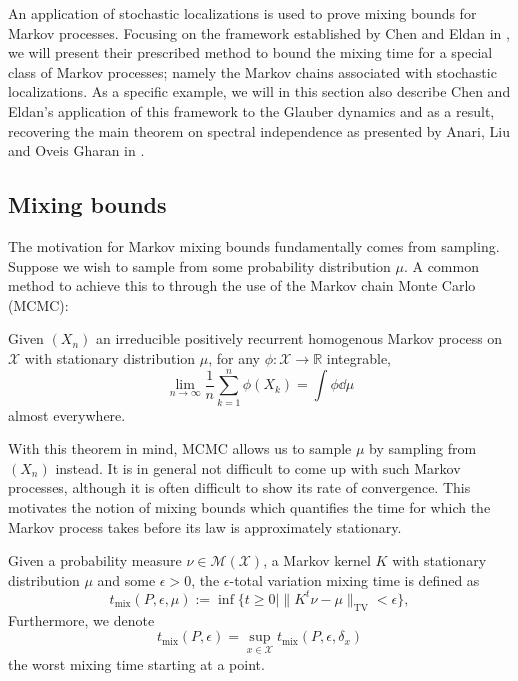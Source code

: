 An application of stochastic localizations is used to prove mixing bounds for Markov processes. 
Focusing on the framework established by Chen and Eldan in \cite{Chen_2022}, we will present their prescribed 
method to bound the mixing time for a special class of Markov processes; namely the Markov chains 
associated with stochastic localizations. 
As a specific example, we will in this section also describe Chen and Eldan's \cite{Chen_2022} application 
of this framework to the Glauber dynamics and as a result, recovering the main theorem on spectral independence as 
presented by Anari, Liu and Oveis Gharan in \cite{Anari_2020}.

\subsection{Mixing bounds}

The motivation for Markov mixing bounds fundamentally comes from sampling. Suppose we wish to sample 
from some probability distribution $\mu$. A common method to achieve this to through the use of the 
Markov chain Monte Carlo (MCMC):
\begin{theorem}\label{thm:markov_conv}
  Given \((X_n)\) an irreducible positively recurrent homogenous Markov process on \(\mathcal{X}\) with
  stationary distribution \(\mu\), for any \(\phi : \mathcal{X} \to \mathbb{R}\) integrable, 
  \[\lim_{n \to \infty} \frac{1}{n} \sum_{k = 1}^n \phi(X_k) = \int \phi \dd \mu\]
  almost everywhere.  
\end{theorem}
With this theorem in mind, MCMC allows us to sample \(\mu\) by sampling from \((X_n)\) instead. It is in general 
not difficult to come up with such Markov processes, although it is often difficult to show its rate of convergence. 
This motivates the notion of mixing bounds which quantifies the time for which the Markov process takes before 
its law is approximately stationary.

\begin{definition}
  Given a probability measure \(\nu \in \mathcal{M}(\mathcal{X})\), a Markov kernel \(K\) with stationary 
  distribution \(\mu\) and some \(\epsilon > 0\), the \(\epsilon\)-total variation mixing time is defined as 
  \[t_{\text{mix}}(P, \epsilon, \mu) := \inf \{t \ge 0 \mid \|K^t\nu - \mu\|_{\text{TV}} < \epsilon\},\]
  Furthermore, we denote 
  \[t_{\text{mix}}(P, \epsilon) = \sup_{x \in \mathcal{X}} t_{\text{mix}}(P, \epsilon, \delta_x)\]
  the worst mixing time starting at a point.
\end{definition}

